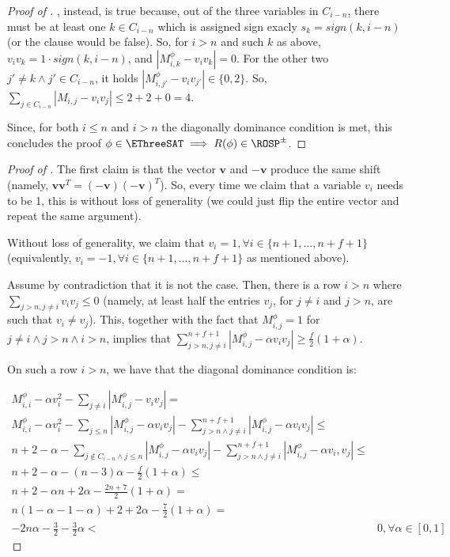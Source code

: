 \begin{proof}[Proof of ]
	, instead, is true because, out of the three variables in $C_{i-n}$, there must be at least one $k\in C_{i-n}$ which is assigned sign exacly $s_k = sign(k,i-n)$ (or the clause would be false). So, for $i>n$ and such $k$ as above, $v_i v_k = 1 \cdot sign(k,i-n)$, and $|M^\phi_{i,k} - v_i v_k| = 0$. For the other two $j'\neq k \land j' \in C_{i-n}$, it holds $|M^\phi_{i,j'} - v_i v_{j'}| \in \{0, 2\}$. So, $ \sum_{j\in C_{i-n}} |M_{i,j} - v_i v_j| \leq 2 + 2 + 0 = 4$.
	
	Since, for both $i\leq n$ and $i > n$ the diagonally dominance condition is met, this concludes the proof $\phi\in\EThreeSAT\implies R(\phi)\in\ROSP^\pm$.	
\end{proof}

\begin{proof}[Proof of ]
	The first claim is that the vector $\mathbf{v}$ and $-\mathbf{v}$ produce the same shift (namely, $\mathbf{vv}^T = \mathbf{(-v)(-v)}^T$). So, every time we claim that a variable $v_i$ needs to be 1, this is without loss of generality (we could just flip the entire vector and repeat the same argument).

	Without loss of generality, we claim that $v_i=1, \forall i\in \{n+1, \dots, n+f+1\}$ (equivalently, $v_i=-1, \forall i\in \{n+1, \dots, n+f+1\}$ as mentioned above). 
	
	Assume by contradiction that it is not the case. Then, there is a row $i > n$ where $\sum_{j>n, j\neq i} v_i v_j \leq 0$ (namely, at least half the entries $v_j$, for $j\neq i$ and $j>n$, are such that $v_i \neq v_j$). This, together with the fact that $M^\phi_{i,j} = 1$ for $j\neq i \land j > n \land i > n$,  implies that $\sum_{j>n,j\neq i}^{n+f+1} |M^\phi_{i,j} - \alpha v_i v_j| \geq \frac{f}{2} (1 + \alpha)$.
	
	On such a row $i>n$, we have that the diagonal dominance condition is:
	
	\begin{align}
		M^\phi_{i,i} - \alpha v_i^2 - \sum_{j\neq i} |M^\phi_{i,j} - v_i v_j| = & \\
		M^\phi_{i,i} - \alpha v_i^2 - \sum_{j\leq n}|M^\phi_{i,j} - \alpha v_i v_j |  - \sum_{j>n\land j\neq i}^{n+f+1} |M^\phi_{i,j} - \alpha v_i v_j| \leq  & \\
		n+2 - \alpha - \sum_{j\notin C_{i-n} \land j\leq n}|M^\phi_{i,j} - \alpha v_i v_j |  - \sum_{j>n \land j\neq i}^{n+f+1}|M^\phi_{i,j} - \alpha v_i, v_j| \leq & \\
		n + 2 - \alpha - (n-3) \alpha - \frac{f}{2}(1 + \alpha)  \leq  & \\
		n + 2 - \alpha n + 2 \alpha -\frac{2n+7}{2} (1+\alpha) = & \\
		n(1 - \alpha - 1 - \alpha) + 2 + 2\alpha - \frac{7}{2}(1+\alpha)  = & \\
		-2n\alpha -\frac{3}{2} - \frac{3}{2}\alpha < & 0, \forall \alpha \in [0, 1]
	\end{align}
	

\end{proof}
